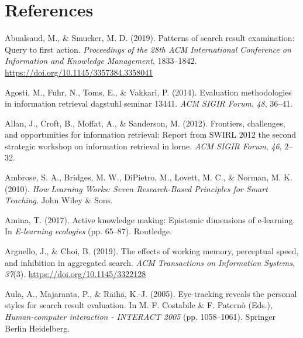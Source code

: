 \documentclass[letterpaper, nobind]{templates/ociamthesis}
\newlength{\cslhangindent}
\newenvironment{CSLReferences}[2] %
 {%
  \setlength{\parindent}{0pt}
  \ifodd #1
  \let\oldpar\par
  \def\par{\hangindent=\cslhangindent\oldpar}
  \fi
  \setlength{\parskip}{1mm}
  \setlength{\baselineskip}{6mm}
 }%
 {}
\begin{document}
\hypertarget{references}{%
\chapter*{References}\label{references}}


\hypertarget{refs}{}
\begin{CSLReferences}{1}{0}
\leavevmode{}%
Abualsaud, M., \& Smucker, M. D. (2019). Patterns of search result examination: {Query} to first action. \emph{Proceedings of the 28th {ACM} International Conference on Information and Knowledge Management}, 1833--1842. \url{https://doi.org/10.1145/3357384.3358041}

\leavevmode{}%
Agosti, M., Fuhr, N., Toms, E., \& Vakkari, P. (2014). Evaluation methodologies in information retrieval dagstuhl seminar 13441. \emph{ACM SIGIR Forum}, \emph{48}, 36--41.

\leavevmode{}%
Allan, J., Croft, B., Moffat, A., \& Sanderson, M. (2012). Frontiers, challenges, and opportunities for information retrieval: Report from SWIRL 2012 the second strategic workshop on information retrieval in lorne. \emph{ACM SIGIR Forum}, \emph{46}, 2--32.

\leavevmode{}%
Ambrose, S. A., Bridges, M. W., DiPietro, M., Lovett, M. C., \& Norman, M. K. (2010). \emph{How {Learning Works}: Seven {Research}-{Based Principles} for {Smart Teaching}}. {John Wiley \& Sons}.

\leavevmode{}%
Amina, T. (2017). Active knowledge making: Epistemic dimensions of e-learning. In \emph{E-learning ecologies} (pp. 65--87). Routledge.

\leavevmode{}%
Arguello, J., \& Choi, B. (2019). The effects of working memory, perceptual speed, and inhibition in aggregated search. \emph{ACM Transactions on Information Systems}, \emph{37}(3). \url{https://doi.org/10.1145/3322128}

\leavevmode{}%
Aula, A., Majaranta, P., \& Räihä, K.-J. (2005). Eye-tracking reveals the personal styles for search result evaluation. In M. F. Costabile \& F. Paternò (Eds.), \emph{Human-computer interaction - {INTERACT} 2005} (pp. 1058--1061). {Springer Berlin Heidelberg}.


\end{CSLReferences}
\end{document}
